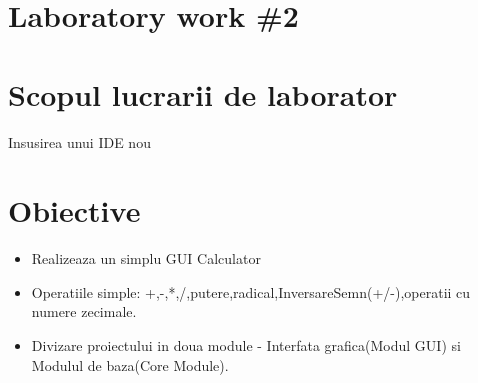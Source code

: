 \section*{Laboratory work \#2}

\section{Scopul lucrarii de laborator}
Insusirea unui IDE nou
\section{Obiective}

\begin{itemize}
	\item Realizeaza un simplu GUI Calculator
\item Operatiile simple: +,-,*,/,putere,radical,InversareSemn(+/-),operatii cu numere zecimale.
\item Divizare proiectului in doua module - Interfata grafica(Modul GUI) si Modulul de baza(Core Module).
\end{itemize}
\clearpage